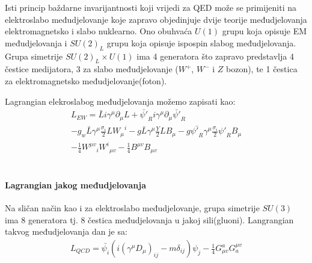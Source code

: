 \documentclass[12pt,a4paper,oneside]{article}
\begin{document}
\begin{linenumbers}
		Isti princip baždarne invarijantnosti koji vrijedi za QED može se primijeniti na elektroslabo međudjelovanje koje zapravo objedinjuje dvije teorije međudjelovanja elektromagnetsko i slabo nuklearno. Ono obuhvaća  \begin{math}
		U(1)
		\end{math} grupu koja opisuje EM međudjelovanja i \begin{math}
		SU(2)_L
		\end{math} grupu koja opisuje ispospin slabog međudjelovanja. Grupa simetrije \begin{math}
		SU(2)_L \times U(1) 
		\end{math} ima 4 generatora što zapravo predstavlja 4 čestice medijatora, 3 za slabo međudjelovanje (\begin{math}
		W^+
		\end{math}, \begin{math}
		W^-
		\end{math} i \begin{math}
		Z
		\end{math} bozon), te 1 čestica za elektromagnetsko međudjelovanje(foton).
		
		Lagrangian elekroslabog međudjelovanja možemo zapisati kao:
		\begin{equation}\label{eq:3}
		\begin{split}
		L_{EW} = \bar{L}i\gamma^{\mu}\partial_\mu L + \bar{\psi '}_R i\gamma^{\mu}\partial_\mu \bar{\psi '}_R \\ - g_w \bar{L}\gamma^\mu \frac{\sigma_i}{2} L {W_\mu}^i - g \bar{L}\gamma^\mu \frac{Y}{2} L B_\mu - g \bar{{\psi'}_R}\gamma^\mu \frac{\sigma_i}{2} {\psi'}_R {B_\mu} \\ - \frac{1}{4}{W^{\mu v}}_i {W^i}_{\mu v} - \frac{1}{4}{B^{\mu v}} {B}_{\mu v}
		\end{split}
		\end{equation}
		~\cite{doktorat}
		
		\paragraph{Lagrangian jakog međudjelovanja\newline}
		Na sličan način kao i za elektroslabo međudjelovanje, grupa simetrije \begin{math}
		SU(3) 
		\end{math} ima 8 generatora tj. 8 čestica međudjelovanja u jakoj sili(gluoni). Langrangian takvog međudjelovanja dan je sa:
		\begin{equation}\label{eq:2}
		\begin{split}
		L_{QCD} = \bar{\psi_i}(i{(\gamma^\mu D_\mu)}_{ij} - m\delta_{ij})\psi_j - \frac{1}{4} G^a_{\mu v}G^{\mu v}_a 
		\end{split}
		\end{equation}
		

\end{linenumbers}
\end{document}
